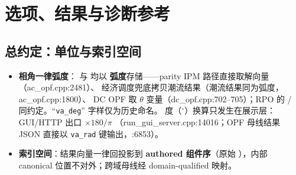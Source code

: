 \section{选项、结果与诊断参考}\label{sec:options}

\subsection{总约定：单位与索引空间}
\begin{itemize}
  \item \textbf{相角一律弧度}： 与  均以
        \textbf{弧度}存储——parity IPM 路径直接取解向量（ac\_opf.cpp:2481）、
        经济调度兜底拷贝潮流结果（潮流结果同为弧度，ac\_opf.cpp:1800）、
        DC OPF 取 $\theta$ 变量（dc\_opf.cpp:702--705）；RPO 的
        / 同约定。``\texttt{va\_deg}'' 字样仅为历史命名。
        度（$^\circ$）换算只发生在展示层：GUI/HTTP 出口 $\times180/\pi$
        （run\_gui\_server.cpp:14016；OPF 母线结果 JSON 直接以 \texttt{va\_rad} 键输出，:6853）。
  \item \textbf{索引空间}：结果向量一律回投影到 \textbf{authored 组件序}（原始
        ），内部 canonical 位置不对外；跨域母线经 domain-qualified 映射。
\end{itemize}

